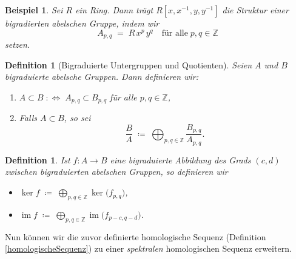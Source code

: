 \documentclass[12pt, hidelinks]{article}
\numberwithin{conj}{section}
\newtheorem{definition}[conj]{Definition}
\newtheorem{example}[conj]{Beispiel}
\newcommand{\Z}{\mathbb{Z}}
\newcommand{\ima}{\operatorname{im}}
\begin{document}
\begin{example}
    Sei $R$ ein Ring. Dann trägt $R[x,x^{-1},y,y^{-1}]$ die Struktur einer bigradierten abelschen Gruppe, indem wir
    \[
        A_{p,q} \;=\; R\,x^p\,y^q
        \quad\text{für alle}\; p,q \in \Z
    \]
    setzen.
\end{example}

\begin{definition}[Bigraduierte Untergruppen und Quotienten]
    Seien $A$ und $B$ bigraduierte abelsche Gruppen. Dann definieren wir:
    \begin{enumerate}[nolistsep]
        \item $A \subset B \;\colon\Leftrightarrow\; A_{p,q} \subset B_{p,q}$ für alle $p,q \in \Z$,
        \item Falls $A \subset B$, so sei
        \[
            \displaystyle
            \frac{B}{A}
            \;\coloneqq\;
            \bigoplus_{p,q \in \Z}
            \frac{B_{p,q}}{A_{p,q}}.
        \]
    \end{enumerate}
\end{definition}

\begin{definition}
    Ist $f: A \to B$ eine bigraduierte Abbildung des Grads $(c,d)$ zwischen bigraduierten abelschen Gruppen, so definieren wir
    \begin{itemize}[nolistsep]
        \item $\displaystyle \ker f \;\coloneqq\; \bigoplus_{p,q \in \Z} \ker \bigl(f_{p,q}\bigr)$,
        \item $\displaystyle \ima f \;\coloneqq\; \bigoplus_{p,q \in \Z} \ima \bigl(f_{p-c,q-d}\bigr)$.
    \end{itemize}
\end{definition}

Nun können wir die zuvor definierte homologische Sequenz (Definition \ref{homologischeSequenz}) zu einer \emph{spektralen} homologischen Sequenz erweitern.
\end{document}
